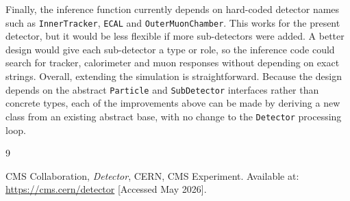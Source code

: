 \documentclass[11pt,a4paper]{article}
\begin{document}
Finally, the inference function currently depends on hard-coded detector names such as \texttt{InnerTracker}, \texttt{ECAL} and \texttt{OuterMuonChamber}. This works for the present detector, but it would be less flexible if more sub-detectors were added. A better design would give each sub-detector a type or role, so the inference code could search for tracker, calorimeter and muon responses without depending on exact strings. Overall, extending the simulation is straightforward. Because the design depends on the abstract \texttt{Particle} and \texttt{SubDetector} interfaces rather than concrete types, each of the improvements above can be made by deriving a new class from an existing abstract base, with no change to the \texttt{Detector} processing loop.

\begin{thebibliography}{9}

CMS Collaboration,
\textit{Detector},
CERN, CMS Experiment.
Available at: \url{https://cms.cern/detector}
[Accessed May 2026].

\end{thebibliography}
\end{document}
